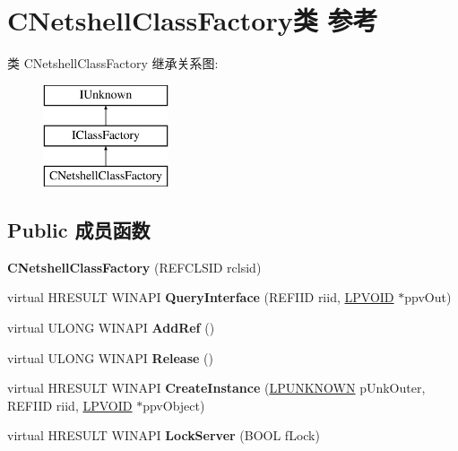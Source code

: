 \hypertarget{class_c_netshell_class_factory}{}\section{C\+Netshell\+Class\+Factory类 参考}
\label{class_c_netshell_class_factory}
类 C\+Netshell\+Class\+Factory 继承关系图\+:\begin{figure}[H]
\begin{center}
\leavevmode
\includegraphics[height=3.000000cm]{class_c_netshell_class_factory}
\end{center}
\end{figure}
\subsection*{Public 成员函数}
\begin{DoxyCompactItemize}
\item 
\mbox{\label{class_c_netshell_class_factory_a94985e76be8d71a742bf336a66269c9d}} 
{\bfseries C\+Netshell\+Class\+Factory} (R\+E\+F\+C\+L\+S\+ID rclsid)
\item 
\mbox{\label{class_c_netshell_class_factory_af84543816b2630ba6e1ff99fb3f0e13d}} 
virtual H\+R\+E\+S\+U\+LT W\+I\+N\+A\+PI {\bfseries Query\+Interface} (R\+E\+F\+I\+ID riid, \hyperlink{interfacevoid}{L\+P\+V\+O\+ID} $\ast$ppv\+Out)
\item 
\mbox{\label{class_c_netshell_class_factory_aa6214a92cd55f40cdc3eec0c30d45a7d}} 
virtual U\+L\+O\+NG W\+I\+N\+A\+PI {\bfseries Add\+Ref} ()
\item 
\mbox{\label{class_c_netshell_class_factory_ada72e325568f7b64c338ec11560d2d3e}} 
virtual U\+L\+O\+NG W\+I\+N\+A\+PI {\bfseries Release} ()
\item 
\mbox{\label{class_c_netshell_class_factory_a99f40949d59ea36fb9b103a775dffa50}} 
virtual H\+R\+E\+S\+U\+LT W\+I\+N\+A\+PI {\bfseries Create\+Instance} (\hyperlink{interface_i_unknown}{L\+P\+U\+N\+K\+N\+O\+WN} p\+Unk\+Outer, R\+E\+F\+I\+ID riid, \hyperlink{interfacevoid}{L\+P\+V\+O\+ID} $\ast$ppv\+Object)
\item 
\mbox{\label{class_c_netshell_class_factory_a4c358133844e64ed5a84c7b0a6ff3099}} 
virtual H\+R\+E\+S\+U\+LT W\+I\+N\+A\+PI {\bfseries Lock\+Server} (B\+O\+OL f\+Lock)
\end{DoxyCompactItemize}
